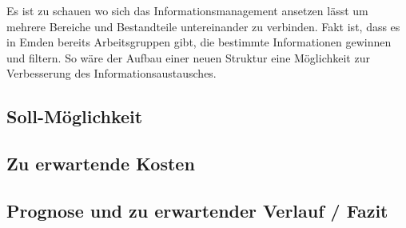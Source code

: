 Es ist zu schauen wo sich das Informationsmanagement ansetzen lässt um mehrere Bereiche und Bestandteile untereinander zu verbinden. Fakt ist, dass es in Emden bereits Arbeitsgruppen gibt, die bestimmte Informationen gewinnen und filtern. So wäre der Aufbau einer neuen Struktur eine Möglichkeit zur Verbesserung des Informationsaustausches.

\subsection{Soll-Möglichkeit}
\subsection{Zu erwartende Kosten}
\subsection{Prognose und zu erwartender Verlauf / Fazit}